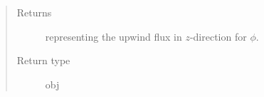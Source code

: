 \documentclass[letterpaper,10pt,english]{sphinxmanual}
\begin{document}
\begin{fulllineitems}
\begin{fulllineitems}
\begin{quote}
\begin{description}
\begin{itemize}
\end{itemize}

\item[{Returns}] \leavevmode
{} representing the upwind flux in \(z\)-direction for \(\phi\).

\item[{Return type}] \leavevmode
obj

\end{description}\end{quote}

\end{fulllineitems}


\end{fulllineitems}

\end{document}
